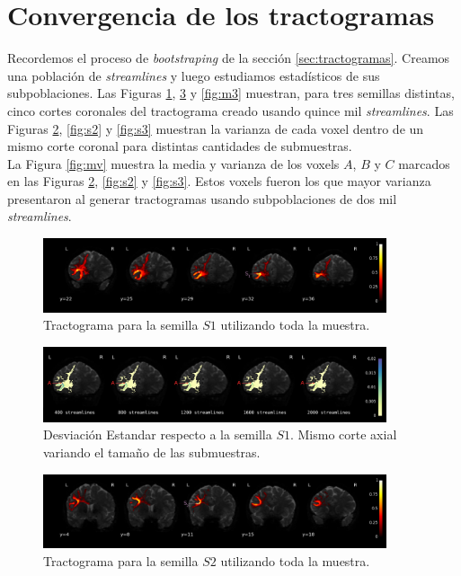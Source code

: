 \section{Convergencia de los tractogramas}

Recordemos el proceso de \textit{bootstraping} de la secci\'on \ref{sec:tractogramas}.
Creamos una poblaci\'on de \textit{streamlines} y luego estudiamos estad\'isticos
de sus subpoblaciones. Las Figuras \ref{fig:m1}, \ref{fig:m2} y \ref{fig:m3} 
muestran, para tres semillas distintas, cinco cortes coronales del tractograma 
creado usando quince mil \textit{streamlines}. Las Figuras \ref{fig:s1}, \ref{fig:s2}
y \ref{fig:s3} muestran la varianza de cada voxel dentro de un mismo corte
coronal para distintas cantidades de submuestras. \\

La Figura \ref{fig:mv} muestra la media y varianza de los voxels $A$, $B$ y $C$
marcados en las Figuras \ref{fig:s1}, \ref{fig:s2} y \ref{fig:s3}. Estos voxels
fueron los que mayor varianza presentaron al generar tractogramas usando 
subpoblaciones de dos mil \textit{streamlines}.\\


\begin{figure}[h!]
   \centering
    \includegraphics[width=0.9\textwidth]{img/m1.png}
    \caption{Tractograma para la semilla $S1$ utilizando toda la muestra.}
    \label{fig:m1}
\end{figure}

\begin{figure}[h!]
   \centering
    \includegraphics[width=0.9\textwidth]{img/s1.png}
    \caption{Desviaci\'on Estandar respecto a la semilla $S1$. Mismo corte axial
             variando el tama\~no de las submuestras.}
    \label{fig:s1}
\end{figure}

\begin{figure}[h!]
   \centering
    \includegraphics[width=0.9\textwidth]{img/m2.png}
    \caption{Tractograma para la semilla $S2$ utilizando toda la muestra.}
    \label{fig:m2}
\end{figure}


